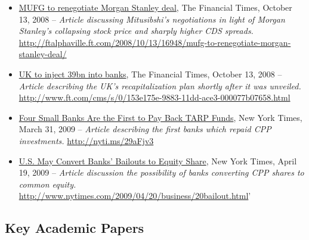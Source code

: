 \documentclass[12pt]{article}
\begin{document}
\begin{itemize}
\item
\ul{MUFG to renegotiate Morgan Stanley deal}, The Financial Times, October 13,
 2008 -- \emph{Article discussing Mitusibshi's negotiations in light of Morgan Stanley's collapsing stock price and sharply higher CDS spreads.} \url{http://ftalphaville.ft.com/2008/10/13/16948/mufg-to-renegotiate-morgan-stanley-deal/}

\item
\ul{UK to inject \textsterling 39bn into banks}, The Financial Times, October 13,
 2008 -- \emph{Article describing the UK's recapitalization plan shortly after it was unveiled.} \url{http://www.ft.com/cms/s/0/153e175e-9883-11dd-ace3-000077b07658.html}
 \item
\ul{Four Small Banks Are the First to Pay Back TARP Funds}, New York Times, March 31,
 2009 -- \emph{Article describing the first banks which repaid CPP investments.} \url{http://nyti.ms/29aFjv3}
\item
\ul{U.S. May Convert Banks' Bailouts to Equity Share}, New York Times, April 19,
 2009 -- \emph{Article discussion the possibility of banks converting CPP shares to common equity.} \url{http://www.nytimes.com/2009/04/20/business/20bailout.html}'

\end{itemize}

\subsection{Key Academic Papers}
\end{document}
